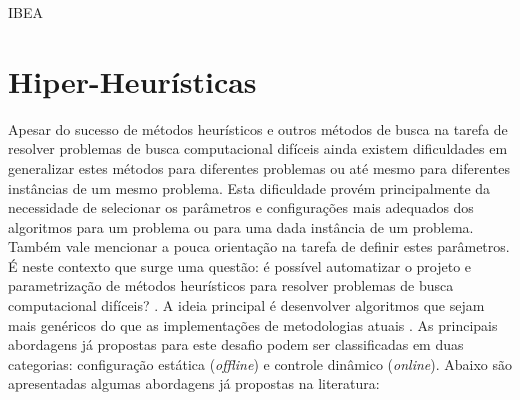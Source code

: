 \begin{algorithm}[htb!]
	\begin{algorithmic}[1]
		
		
		
		
		\EndWhile
		
		\EndWhile
		
	\end{algorithmic}
	\caption{IBEA}
	\label{alg:ibea}
\end{algorithm}


\section{Hiper-Heurísticas }
\label{Hiper-Heuristicas}

Apesar do sucesso de métodos heurísticos e outros métodos de busca na tarefa de resolver problemas de busca computacional difíceis ainda existem dificuldades em generalizar estes métodos para diferentes problemas ou até mesmo para diferentes instâncias de um mesmo problema. Esta dificuldade provém principalmente da necessidade de selecionar os parâmetros e configurações mais adequados dos algoritmos para um problema ou para uma dada instância de um problema. Também vale mencionar a pouca orientação na tarefa de definir estes parâmetros.  É neste contexto que surge uma questão: é possível automatizar o projeto e parametrização de métodos heurísticos para resolver problemas de busca computacional difíceis? \cite{burke2013hyper}. A ideia principal é desenvolver algoritmos que sejam mais genéricos do que as implementações de metodologias atuais \cite{burke2013hyper}. As principais abordagens já propostas para este desafio podem ser classificadas em duas categorias: configuração estática (\textit{offline}) e controle dinâmico (\textit{online}). Abaixo são apresentadas algumas abordagens já propostas na literatura:

